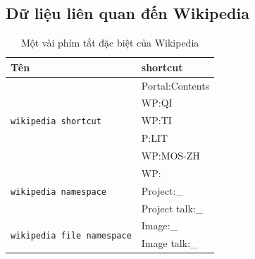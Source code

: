 \subsection*{Dữ liệu liên quan đến Wikipedia}
\begin{table}[htb]
    \centering
    \caption{Một vài phím tắt đặc biệt của Wikipedia}
    \label{table:wikipedia-shortcuts}
    \begin{tabular}{l l}
        \toprule
        \textbf{Tên}                                                    & \textbf{shortcut} \\\midrule
        \multirow{5}{*}{\texttt{wikipedia shortcut\footnotemark}}       & Portal:Contents   \\
                                                                        & WP:QI             \\
                                                                        & WP:TI             \\
                                                                        & P:LIT             \\
                                                                        & WP:MOS-ZH         \\\midrule
        \multirow{3}{*}{\texttt{wikipedia namespace\footnotemark}}      & WP:\              \\
                                                                        & Project:\_        \\
                                                                        & Project talk:\_   \\\midrule
        \multirow{2}{*}{\texttt{wikipedia file namespace\footnotemark}} & Image:\_          \\
                                                                        & Image talk:\_     \\
        \bottomrule
    \end{tabular}
\end{table}

\newpage
